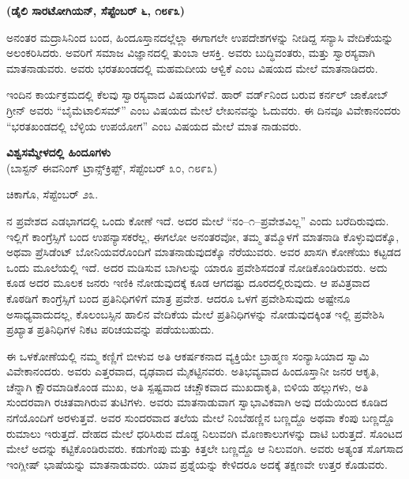 \delimiter

\vskip -1.2cm

\begin{center}
\textbf{(ಡೈಲಿ ಸಾರಟೋಗಿಯನ್​, ಸೆಪ್ಟೆಂಬರ್​ ೬, ೧೮೯೩)}
\end{center}

\vskip -0.35cm

ಅನಂತರ ಮದ್ರಾಸಿನಿಂದ ಬಂದ, ಹಿಂದೂಸ್ತಾನದಲ್ಲೆಲ್ಲಾ ಈಗಾಗಲೇ ಉಪದೇಶಗಳನ್ನು ನೀಡಿದ್ದ ಸನ್ಯಾಸಿ ವೇದಿಕೆಯನ್ನು ಅಲಂಕರಿಸಿದರು. ಅವರಿಗೆ ಸಮಾಜ ವಿಜ್ಞಾನದಲ್ಲಿ ತುಂಬಾ ಆಸಕ್ತಿ. ಅವರು ಬುದ್ಧಿವಂತರು, ಮತ್ತು ಸ್ವಾರಸ್ಯವಾಗಿ ಮಾತನಾಡುವರು. ಅವರು ಭರತಖಂಡದಲ್ಲಿ ಮಹಮದೀಯ ಆಳ್ವಿಕೆ ಎಂಬ ವಿಷಯದ ಮೇಲೆ ಮಾತನಾಡಿದರು.

ಇಂದಿನ ಕಾರ್ಯಕ್ರಮದಲ್ಲಿ ಕೆಲವು ಸ್ವಾರಸ್ಯವಾದ ವಿಷಯಗಳಿವೆ. ಹಾರ್​ ವರ್ಡ್​ನಿಂದ ಬರುವ ಕರ್ನಲ್​ ಜಾಕೋಬ್​ ಗ್ರೀನ್​ ಅವರು “ಬೈಮೆಟಾಲಿಸಮ್​” ಎಂಬ ವಿಷಯದ ಮೇಲೆ ಲೇಖನವನ್ನು ಓದುವರು. ಈ ದಿನವೂ ವಿವೇಕಾನಂದರು “ಭರತಖಂಡದಲ್ಲಿ ಬೆಳ್ಳಿಯ ಉಪಯೋಗ” ಎಂಬ ವಿಷಯದ ಮೇಲೆ ಮಾತ ನಾಡುವರು.

\delimiter

\vskip -1.2cm

\begin{center}
\textbf{ವಿಶ್ವಸಮ್ಮೇಳದಲ್ಲಿ ಹಿಂದೂಗಳು}\\ (ಬಾಸ್ಟನ್​ ಈವನಿಂಗ್​ ಟ್ರಾನ್ಸ್​ಕ್ರಿಪ್ಟ್​, ಸೆಪ್ಟೆಂಬರ್​ ೩೦, ೧೮೯೩)
\end{center}

\vskip -0.35cm

ಚಿಕಾಗೊ, ಸೆಪ್ಟೆಂಬರ್​ ೨೩.

ನ ಪ್ರವೇಶದ ಎಡಭಾಗದಲ್ಲಿ ಒಂದು ಕೋಣೆ ಇದೆ. ಅದರ ಮೇಲೆ “ನಂ–೧–ಪ್ರವೇಶವಿಲ್ಲ” ಎಂದು ಬರೆದಿರುವುದು. ಇಲ್ಲಿಗೆ ಕಾಂಗ್ರೆಸ್ಸಿಗೆ ಬಂದ ಉಪನ್ಯಾಸಕ\break ರೆಲ್ಲ, ಈಗಲೋ ಅನಂತರವೋ, ತಮ್ಮ ತಮ್ಮೊಳಗೆ ಮಾತನಾಡಿ ಕೊಳ್ಳುವುದಕ್ಕೊ, ಅಥವಾ ಪ್ರೆಸಿಡೆಂಟ್​ ಬೋನಿಯವರೊಂದಿಗೆ ಮಾತನಾಡುವುದಕ್ಕೊ ನೆರೆಯುವರು. ಅವರ ಖಾಸಗಿ ಕೋಣೆಯು ಕಟ್ಟಡದ ಒಂದು ಮೂಲೆಯಲ್ಲಿ ಇದೆ. ಅದರ ಮಡಿಸುವ ಬಾಗಿಲನ್ನು ಯಾರೂ ಪ್ರವೇಶಿಸದಂತೆ ನೋಡಿಕೊಂಡಿರುವರು. ಅದು ಕೂಡ ಅದರ ಮೂಲಕ ಜನರು ಇಣಿಕಿ ನೋಡುವುದಕ್ಕೆ ಕೂಡ ಆಗದಷ್ಟು ದೂರದಲ್ಲಿರುವುದು. ಆ ಪವಿತ್ರವಾದ ಕೊಠಡಿಗೆ ಕಾಂಗ್ರೆಸ್ಸಿಗೆ ಬಂದ ಪ್ರತಿನಿಧಿಗಳಿಗೆ ಮಾತ್ರ ಪ್ರವೇಶ. ಆದರೂ ಒಳಗೆ ಪ್ರವೇಶಿಸುವುದು ಅಷ್ಟೇನೂ ಅಸಾಧ್ಯವಾದುದಲ್ಲ, ಕೊಲಂಬಸ್ಸಿನ ಹಾಲಿನ ವೇದಿಕೆಯ ಮೇಲೆ ಪ್ರತಿನಿಧಿಗಳನ್ನು ನೋಡುವುದಕ್ಕಿಂತ ಇಲ್ಲಿ ಪ್ರವೇಶಿಸಿ ಪ್ರಖ್ಯಾತ ಪ್ರತಿನಿಧಿಗಳ ನಿಕಟ ಪರಿಚಯವನ್ನು ಪಡೆಯಬಹುದು.

ಈ ಒಳಕೋಣೆಯಲ್ಲಿ ನಮ್ಮ ಕಣ್ಣಿಗೆ ಬೀಳುವ ಅತಿ ಆಕರ್ಷಕನಾದ ವ್ಯಕ್ತಿಯೇ ಬ್ರಾಹ್ಮಣ ಸಂನ್ಯಾಸಿಯಾದ ಸ್ವಾಮಿ ವಿವೇಕಾನಂದರು. ಅವರು ಎತ್ತರವಾದ, ದೃಢವಾದ ಮೈಕಟ್ಟಿನವರು. ಅತಿಭವ್ಯವಾದ ಹಿಂದೂಸ್ತಾನೀ ಜನರ ಆಕೃತಿ, ಚೆನ್ನಾಗಿ ಕ್ಷೌರಮಾಡಿಕೊಂಡ ಮುಖ, ಅತಿ ಸ್ಪಷ್ಟವಾದ ಚಚ್ಚೌಕವಾದ ಮುಖದಾಕೃತಿ, ಬಿಳಿಯ ಹಲ್ಲುಗಳು, ಅತಿ ಸುಂದರವಾಗಿ ರಚಿತವಾಗಿರುವ ತುಟಿಗಳು. ಅವರು ಮಾತನಾಡುವಾಗ ಸ್ವಾಭಾವಿಕವಾಗಿ ಅವು ದಯೆಯಿಂದ ಕೂಡಿದ ನಗೆಯೊಂದಿಗೆ ಅರಳುತ್ತವೆ. ಅವರ ಸುಂದರವಾದ ತಲೆಯ ಮೇಲೆ ನಿಂಬೆಹಣ್ಣಿನ ಬಣ್ಣದ್ದೊ ಅಥವಾ ಕೆಂಪು ಬಣ್ಣದ್ದೊ ರುಮಾಲು ಇರುತ್ತದೆ. ದೇಹದ ಮೇಲೆ ಧರಿಸಿರುವ ದೊಡ್ಡ ನಿಲುವಂಗಿ ಮೊಣಕಾಲುಗಳನ್ನು ದಾಟಿ ಬರುತ್ತದೆ. ಸೊಂಟದ ಮೇಲೆ ಅದನ್ನು ಕಟ್ಟಿಕೊಂಡಿರುವರು. ಕಡುಗೆಂಪು ಮತ್ತು ಕಿತ್ತಲೇ ಬಣ್ಣದ್ದೊ ಆ ನಿಲುವಂಗಿ. ಅವರು ಅತ್ಯಂತ ಸೊಗಸಾದ ಇಂಗ್ಲೀಷ್​ ಭಾಷೆಯನ್ನು ಮಾತನಾಡುವರು. ಯಾವ ಪ್ರಶ್ನೆಯನ್ನು ಕೇಳಿದರೂ ಅದಕ್ಕೆ ತಕ್ಷಣವೇ ಉತ್ತರ ಕೊಡುವರು.

